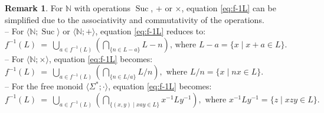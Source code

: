 \documentclass[11pt,a4paper]{article}
\theoremstyle{definition} %
\newtheorem{remark}[theorem]{Remark}
\newcommand\+[1]{\mathcal{#1}} %
\newcommand{\N}{{\mathbb N}}     %
\DeclareMathOperator{\suc}{Suc}%
\begin{document}
\begin{remark} For $\N$ with operations $\suc$, +  or $\times$,  equation \eqref{eq:f-1L} can be simplified due to the associativity and commutativity of the operations.
\\
-- For  $\langle \N;\suc\rangle$ or $\langle \N;+\rangle$,  equation \eqref{eq:f-1L} reduces to: \\$f^{-1}(L) \ =\ \bigcup_{a\in f^{-1}(L)}\left({\bigcap}_{\{n\in L-a\}}L-n\right) \text{,\ where\ } L-a=\{x\mid x+a\in L\}.$ 
\\-- For $\langle \N;\times\rangle$,  equation \eqref{eq:f-1L} becomes: \\$f^{-1}(L) \ =\ {\bigcup}_{a\in f^{-1}(L)}\left({\bigcap}_{\{n \in L/a\}}L/n \right), \text{\ where\ } L/n=\{x\mid nx\in L\}.$
\\-- For the free monoid $\langle \Sigma^*;\cdot\rangle$, equation \eqref{eq:f-1L} becomes:
\\$f^{-1}(L) \ =\ {\bigcup}_{a\in f^{-1}(L)}\left({\bigcap}_{\{(x,y) \mid xay \in L\}} x^{-1}Ly^{-1} \right), \text{\ where\ } x^{-1}Ly^{-1}=\{z\mid xzy\in L\}.$
\end{remark}
\fi%
\end{document}
